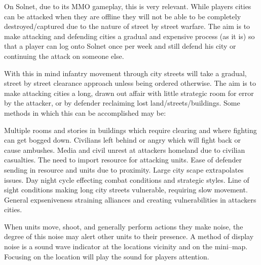On Solnet, due to its MMO gameplay, this is very relevant. While players cities can be attacked when they are offline they will not be able to be completely destroyed/captured due to the nature of street by street warfare. The aim is to make attacking and defending cities a gradual and expensive process (as it is) so that a player can log onto Solnet once per week and still defend his city or continuing the attack on someone else. 

With this in mind infantry movement through city streets will take a gradual, street by street clearance approach unless being ordered otherwise. The aim is to make attacking cities a long, drawn out affair with little strategic room for error by the attacker, or by defender reclaiming lost land/streets/buildings. Some methods in which this can be accomplished may be:
 
Multiple rooms and stories in buildings which require clearing and where fighting can get bogged down.
 Civilians left behind or angry which will fight back or cause ambushes.
 Media and civil unrest at attackers homeland due to civilian casualties.
 The need to import resource for attacking units.
 Ease of defender sending in resource and units due to proximity.
 Large city scape extrapolates issues. 
 Day night cycle effecting combat conditions and strategic styles.
 Line of sight conditions making long city streets vulnerable, requiring slow movement.
 General expseniveness straining alliances and creating vulnerabilities in attackers cities. 





When units move, shoot, and generally perform actions they make noise, the degree of this noise may alert other units to their presence. A method of display noise is a sound wave indicator at the locations vicinity and on the mini--map. Focusing on the location will play the sound for players attention.

